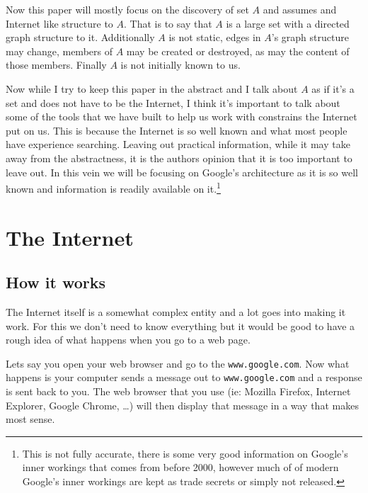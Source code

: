 \documentclass{article}
\begin{document}
	Now this paper will mostly focus on the discovery of set $A$ and assumes and Internet like structure to $A$. That is to say that $A$ is a large set with a directed graph structure to it. Additionally $A$ is not static, edges in $A$'s graph structure may change, members of $A$ may be created or destroyed, as may the content of those members. Finally $A$ is not initially known to us.
	
	Now while I try to keep this paper in the abstract and I talk about $A$ as if it's a set and does not have to be the Internet, I think it's important to talk about some of the tools that we have built to help us work with constrains the Internet put on us. This is because the Internet is so well known and what most people have experience searching. Leaving out practical information, while it may take away from the abstractness, it is the authors opinion that it is too important to leave out. In this vein we will be focusing on Google's architecture as it is so well known and information is readily available on it.\footnote{This is not fully accurate, there is some very good information on Google's inner workings that comes from before 2000, however much of of modern Google's inner workings are kept as trade secrets or simply not released.}
	
	
	
	
	\section{The Internet}
	
	\subsection{How it works}
	The Internet itself is a somewhat complex entity and a lot goes into making it work. For this we don't need to know everything  but it would be good to have a rough idea of what happens when you go to a web page.
	
	Lets say you open your web browser and go to the \verb|www.google.com|. Now what happens is your computer sends a message out to \verb|www.google.com| and a response is sent back to you. The web browser that you use (ie: Mozilla Firefox, Internet Explorer, Google Chrome, \ldots) will then display that message in a way that makes most sense.
	
\end{document}
